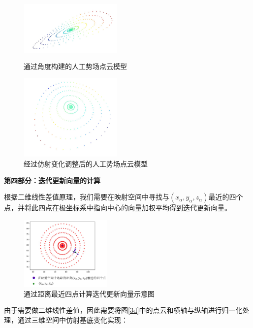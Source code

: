 \documentclass{my_paper}
\begin{document}
\begin{figure}[htbp]
    \centering
    \begin{minipage}[t]{0.48\textwidth}
        \centering
        \includegraphics[width=5cm]{images/3d.jpg}
        \caption{通过角度构建的人工势场点云模型}
        \label{3d}
    \end{minipage}
    \begin{minipage}[t]{0.48\textwidth}
        \centering
        \includegraphics[width=5cm]{images/3dn.jpg}
        \caption{经过仿射变化调整后的人工势场点云模型}
        \label{3dn}
    \end{minipage}
\end{figure}

\textbf{第四部分：迭代更新向量的计算}

根据二维线性差值原理，我们需要在映射空间中寻找与$(x_{\alpha}, y_{\alpha}, z_{\alpha})$最近的四个点，并将此四点在极坐标系中指向中心的向量加权平均得到迭代更新向量。

\begin{figure}[h]
    \centering
    \includegraphics[width=0.4\textwidth]{images/sigedian.jpg}
    \caption{通过距离最近四点计算迭代更新向量示意图}
    \label{sigedian}
\end{figure}

由于需要做二维线性差值，因此需要将图\ref{3d}中的点云和横轴与纵轴进行归一化处理，通过三维空间中仿射基底变化实现：
\end{document}
